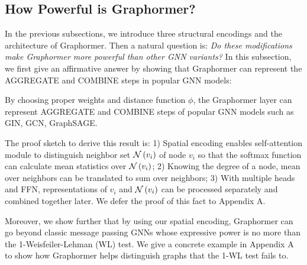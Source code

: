 \documentclass{article}
\begin{document}
\subsection{How Powerful is Graphormer?}
\label{sec:expressive}
In the previous subsections, we introduce three structural encodings and the architecture of Graphormer. Then a natural question is: \emph{Do these modifications make Graphormer more powerful than other GNN variants? } In this subsection, we first give an affirmative answer by showing that Graphormer can represent the AGGREGATE and COMBINE steps in popular GNN models:

\begin{fact}
\label{fact:recover_gnn}
By choosing proper weights and distance function $\phi$, the Graphormer layer can represent AGGREGATE and COMBINE steps of popular GNN models such as GIN, GCN, GraphSAGE.
\end{fact}
The proof sketch to derive this result is: 1) Spatial encoding enables self-attention module to distinguish neighbor set $\mathcal{N}\left(v_i\right)$ of node $v_i$ so that the softmax function can calculate mean statistics over $\mathcal{N}\left(v_i\right)$; 2) Knowing the degree of a node, mean over neighbors can be translated to sum over neighbors; 3) With multiple heads and FFN, representations of $v_i$ and $\mathcal{N}\left(v_i\right)$ can be processed separately and combined together later. We defer the proof of this fact to Appendix A.

Moreover, we show further that by using our spatial encoding, Graphormer can go beyond classic message passing GNNs whose expressive power is no more than the 1-Weisfeiler-Lehman (WL) test. We give a concrete example in Appendix A to show how Graphormer helps distinguish graphs that the 1-WL test fails to.
\end{document}
